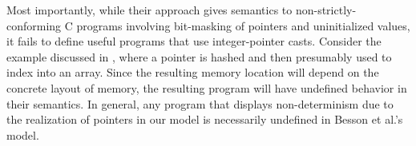 Most importantly, while their approach gives semantics to non-strictly-conforming C programs
involving bit-masking of pointers and uninitialized values, it fails to define useful programs that
use integer-pointer casts.  Consider the  example discussed in
, where a pointer is hashed and then presumably used
to index into an array.  Since the resulting memory location will depend on the concrete layout of
memory, the resulting program will have undefined behavior in their semantics.  In general, any
program that displays non-determinism due to the realization of pointers in our model is necessarily
undefined in Besson et al.'s model.






